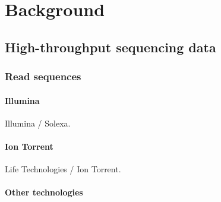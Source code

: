 
\chapter{Background}


\section{High-throughput sequencing data}
\label{sec:background:sequencing}


\subsection{Read sequences}

\subsubsection{Illumina}
Illumina / Solexa.

\subsubsection{Ion Torrent}
Life Technologies / Ion Torrent.

\subsubsection{Other technologies}

